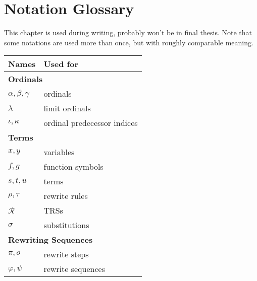 \chapter*{Notation Glossary}

This chapter is used during writing, probably won't be in final thesis. Note
that some notations are used more than once, but with roughly comparable
meaning.

{\renewcommand{\arraystretch}{1.1}
\renewcommand{\tabcolsep}{10pt}
\begin{tabular}{p{150pt} p{175pt}}
Names & Used for\\
\hline
\multicolumn{2}{l}{\bf Ordinals}\\
$\alpha, \beta, \gamma$ & ordinals\\
$\lambda$ & limit ordinals\\
$\iota, \kappa$ & ordinal predecessor indices\\
\multicolumn{2}{l}{\bf Terms}\\
$x, y$ & variables\\
$f, g$ & function symbols\\
$s, t, u$ & terms\\
$\rho, \tau$ & rewrite rules\\
$\mathcal{R}$ & TRSs\\
$\sigma$ & substitutions\\
\multicolumn{2}{l}{\bf Rewriting Sequences}\\
$\pi, o$ & rewrite steps\\
$\varphi, \psi$ & rewrite sequences\\
\end{tabular}}

